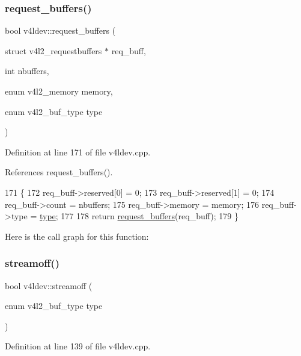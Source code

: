 \subsubsection{\texorpdfstring{request\+\_\+buffers()}{request\_buffers()}\hspace{0.1cm}{\footnotesize\ttfamily [2/2]}}
{\footnotesize\ttfamily bool v4ldev\+::request\+\_\+buffers (\begin{DoxyParamCaption}\item[{struct v4l2\+\_\+requestbuffers $\ast$}]{req\+\_\+buff,  }\item[{int}]{nbuffers,  }\item[{enum v4l2\+\_\+memory}]{memory,  }\item[{enum v4l2\+\_\+buf\+\_\+type}]{type }\end{DoxyParamCaption})}



Definition at line 171 of file v4ldev.\+cpp.



References request\+\_\+buffers().


\begin{DoxyCode}
171                                                                                                            
                             \{
172     req\_buff->reserved[0] = 0;
173     req\_buff->reserved[1] = 0;
174     req\_buff->count = nbuffers;
175     req\_buff->memory = memory;
176     req\_buff->type = \hyperlink{classstd_1_1conditional_1_1type}{type};
177 
178     \textcolor{keywordflow}{return} \hyperlink{classv4ldev_a432cce3442cbc7d5cf7b295073b4ef0a}{request\_buffers}(req\_buff);
179 \}
\end{DoxyCode}
Here is the call graph for this function\+:
\mbox{\label{classv4ldev_a969a8c970864242b50f0532ebc38e900}} 
\subsubsection{\texorpdfstring{streamoff()}{streamoff()}}
{\footnotesize\ttfamily bool v4ldev\+::streamoff (\begin{DoxyParamCaption}\item[{enum v4l2\+\_\+buf\+\_\+type}]{type }\end{DoxyParamCaption})}



Definition at line 139 of file v4ldev.\+cpp.



